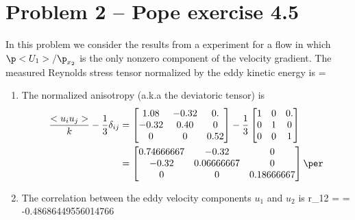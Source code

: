 \documentclass[11pt]{article}
\begin{document}
\section*{Problem 2 -- Pope exercise 4.5}
In this problem we consider the results from a experiment for a flow in which $\p <U_1>/\p_{x_2}$ is the only nonzero component of the velocity gradient. The measured Reynolds stress tensor normalized by the eddy kinetic energy is
\beq
            \label{eq:reynolds}
 =  \left[ \begin{matrix}
        1.08 & -0.32 & 0. \\
        -0.32 & 0.40 & 0 \\
        0 & 0 & 0.52
\end{matrix} \right]\per
\eeq

\begin{enumerate}[label=(\alph*)]
    \item The normalized anisotropy (a.k.a the deviatoric tensor)  is
        \begin{align}
            \frac{<u_i u_j>}{k} - \frac{1}{3}\delta_{ij} &=  \left[ \begin{matrix}
        1.08 & -0.32 & 0. \\
        -0.32 & 0.40 & 0 \\
        0 & 0 & 0.52
\end{matrix} \right] - \frac{1}{3} \left[ \begin{matrix}
        1 & 0 & 0. \\
        0 & 1 & 0 \\
        0 & 0 & 1
\end{matrix} \right] \nonumber \\  &= \left[ \begin{matrix}
        0.74666667 & -0.32 & 0 \\
        -0.32 &  0.06666667 &  0   \\
0 &  0 &0.18666667\end{matrix} \right]\per
    \end{align}

    \item The correlation between the eddy velocity components $u_1$ and $u_2$ is
        \beq
            r_{12} =  = -0.48686449556014766\per
            \eeq



\end{enumerate}
\end{document}
